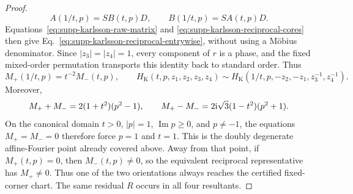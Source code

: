 \begin{proof}
\begin{equation}
 A(1/t,p)=S B(t,p)D,\qquad B(1/t,p)=S A(t,p)D.
\label{eq:supp-karlsson-reciprocal-cores}
\end{equation}
Equations~\eqref{eq:supp-karlsson-raw-matrix} and \eqref{eq:supp-karlsson-reciprocal-cores} then give Eq.~\eqref{eq:supp-karlsson-reciprocal-entrywise}, without using a M\"obius denominator.  Since $|z_3|=|z_4|=1$, every component of $r$ is a phase, and the fixed mixed-order permutation transports this identity back to standard order.  Thus
\begin{equation}
M_+(1/t,p)=t^{-2}M_-(t,p),
\qquad
H_{\mathrm K}(t,p,z_1,z_2,z_3,z_4)\sim
H_{\mathrm K}(1/t,p,-z_2,-z_1,z_3^{-1},z_4^{-1}).
\label{eq:supp-karlsson-reciprocal-orientation}
\end{equation}
Moreover,
\begin{equation}
M_++M_-=2(1+t^2)(p^2-1),
\qquad
M_+-M_-=2\mathrm i\sqrt3(1-t^2)(p^2+1).
\label{eq:supp-karlsson-common-degeneracy}
\end{equation}
On the canonical domain $t>0$, $|p|=1$, $\operatorname{Im}p\ge0$, and $p\ne-1$, the equations $M_+=M_-=0$ therefore force $p=1$ and $t=1$.  This is the doubly degenerate affine-Fourier point already covered above.  Away from that point, if $M_+(t,p)=0$, then $M_-(t,p)\ne0$, so the equivalent reciprocal representative has $M_+\ne0$.  Thus one of the two orientations always reaches the certified fixed-corner chart.  The same residual $R$ occurs in all four resultants.


\end{proof}
